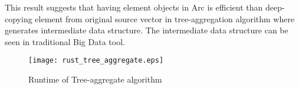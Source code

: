 This result suggests that having element objects in Arc is efficient than deep-copying element from original source vector in tree-aggregation algorithm 
where generates intermediate data structure. The intermediate data structure can be seen in traditional Big Data tool.



\begin{figure}[htb]
    \texttt{[image: rust\_tree\_aggregate.eps]}
    \caption{Runtime of Tree-aggregate algorithm}
    \label{fig:Sampling}
\end{figure}
